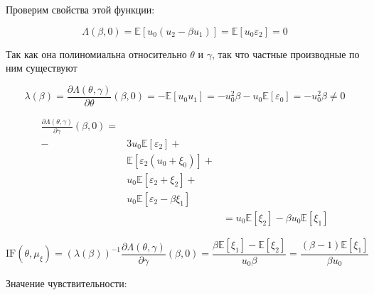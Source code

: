 \documentclass{article}
\begin{document}
\begin{enumerate}
	      Проверим свойства этой функции:

	      \[
		      \Lambda(\beta, 0) = \mathbb{E} [u_0 (u_2 - \beta u_1)] = \mathbb{E} [u_0 \varepsilon_2] = 0
	      \]

	      Так как она полиномиальна относительно $\theta$ и $\gamma$, так что частные производные по ним существуют

	      \[
		      \lambda(\beta) = \frac{\partial \Lambda(\theta, \gamma)}{\partial \theta}(\beta, 0) = -\mathbb{E} [u_0 u_1] = -u_0^2 \beta - u_0 \mathbb{E}
		      [\varepsilon_0] = -u_0^2 \beta \neq 0
	      \]

	      \begin{equation*}
		      \begin{aligned}
			      \frac{\partial \Lambda(\theta, \gamma)}{\partial \gamma}(\beta, 0) = &                                              &                                                        \\
			      -                                                                    & 3 u_0 \mathbb{E} [\varepsilon_2] +           &                                                        \\
			                                                                           & \mathbb{E} [\varepsilon_2(u_0 + \xi_0)] +    &                                                        \\
			                                                                           & u_0 \mathbb{E} [\varepsilon_2+ \xi_2] +      &                                                        \\
			                                                                           & u_0 \mathbb{E} [\varepsilon_2 - \beta \xi_1] &                                                        \\
			                                                                           &                                              & = u_0 \mathbb{E} [\xi_2] -\beta u_0 \mathbb{E} [\xi_1]
		      \end{aligned}
	      \end{equation*}

	      \[
		      \mathrm{IF}(\theta, \mu_{\xi}) =
		      (\lambda(\beta))^{-1} \frac{\partial \Lambda(\theta, \gamma)}{\partial \gamma}(\beta, 0) =
		      \frac{\beta \mathbb{E} [\xi_1] - \mathbb{E} [\xi_2]}{u_0 \beta} =
		      \frac{(\beta - 1) \mathbb{E} [\xi_1]}{\beta u_0}
	      \]

	      Значение чувствительности:


\end{enumerate}
\end{document}
